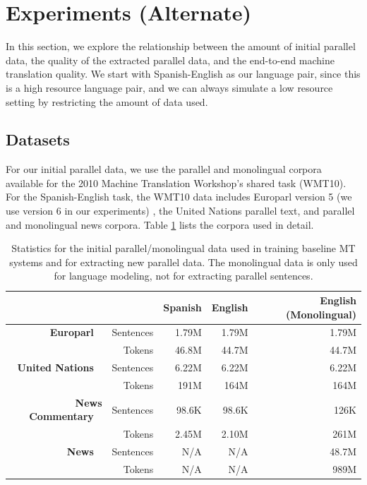 \section{Experiments (Alternate)}
\label{sec:experiments_all}
In this section, we explore the relationship between the amount of initial
parallel data, the quality of the extracted parallel data, and the end-to-end
machine translation quality. We start with Spanish-English as our language pair,
since this is a high resource language pair, and we can always simulate a low
resource setting by restricting the amount of data used.

\subsection{Datasets}
For our initial parallel data, we use the parallel and monolingual corpora
available for the 2010 Machine Translation Workshop's shared task (WMT10). For
the Spanish-English task, the WMT10 data includes Europarl version 5 (we use
version 6 in our experiments) \citep{Koehn05}, the United Nations
parallel text, and parallel and monolingual news corpora. Table \ref{table:esen_parallel}
lists the corpora used in detail.

\begin{table}[ht]
\begin{center}
\begin{tabular}{|rr||r|r|r|}
\hline
      &                & Spanish        & English & English (Monolingual) \\
\hline
\textbf{Europarl} \
      & Sentences     & 1.79M       & 1.79M   & 1.79M   \\
      & Tokens     & 46.8M       & 44.7M   & 44.7M   \\
\hline
\textbf{United Nations} \
      & Sentences     & 6.22M       & 6.22M & 6.22M     \\
      & Tokens     & 191M       & 164M & 164M     \\
\hline
\textbf{News Commentary} \
      & Sentences     & 98.6K       & 98.6K & 126K      \\
      & Tokens     & 2.45M       & 2.10M  & 261M    \\
\hline
\textbf{News} \
      & Sentences     & N/A       & N/A & 48.7M     \\
      & Tokens     & N/A       & N/A & 989M     \\
\hline
\end{tabular}
\end{center}
\caption{Statistics for the initial parallel/monolingual data used in training
baseline MT systems and for extracting new parallel data. The monolingual data
is only used for language modeling, not for extracting parallel sentences.}
\label{table:esen_parallel}
\end{table}

